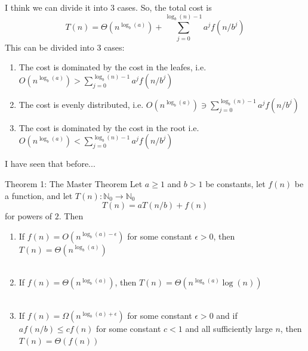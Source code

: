 \documentclass[12pt]{beamer}
\begin{document}
\begin{frame}{I think we can divide it into 3 cases.}
So, the total cost is
\[
T(n) = \Theta(n^{\log_b(a)}) + \sum_{j=0}^{\log_b(n) - 1} a^j f(n/b^j)
\]
\pause
This can be divided into 3 cases:
\begin{enumerate}
\item The cost is dominated by the cost in the leafes, i.e. $O(n^{\log_b(a)}) > \sum_{j=0}^{\log_b(n)-1}a^j f(n/b^j)$
\pause
\item The cost is evenly distributed, i.e. $O(n^{\log_b(a)}) \ni \sum_{j=0}^{\log_b(n)-1}a^j f(n/b^j)$
\pause
	\item The cost is dominated by the cost in the root i.e. $O(n^{\log_b(a)}) < \sum_{j=0}^{\log_b(n)-1}a^j f(n/b^j)$
\end{enumerate}
\end{frame}

\begin{frame}{}
\begin{center}
I have seen that before...
\end{center}
\end{frame}

%
%
%
%
\begin{frame}{}
\begin{block}{Theorem 1: The Master Theorem}
Let $a \geq 1$ and $b > 1$ be constants, let $f(n)$ be a function, and let $T(n): \mathbb{N}_0 \rightarrow \mathbb{N}_0$
\[
T(n) = aT(n/b) + f(n)
\]
for powers of $2$. Then
\begin{enumerate}
\item If $f(n) = O(n^{\log_b(a) - \epsilon})$ for some constant $\epsilon > 0$, then $T(n) = \Theta(n^{\log_b(a)})$
\\~
\item If $f(n) = \Theta(n^{\log_b(a)})$, then $T(n) = \Theta(n^{\log_b(a)}\log(n))$
\\~
\item If $f(n) = \Omega(n^{\log_b(a)+\epsilon})$ for some constant $\epsilon > 0$ and if $af(n/b) \leq cf(n)$ for
some constant $c < 1$ and all sufficiently large $n$, then $T(n) = \Theta(f(n))$
\end{enumerate}
\end{block}
\end{frame}
\end{document}
